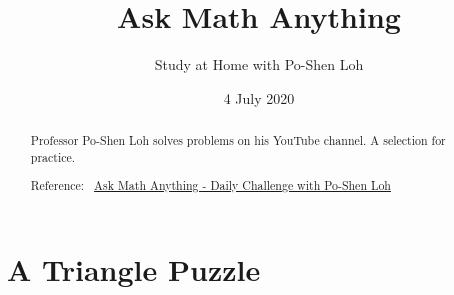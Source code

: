 \documentclass[12pt]{article}
\title{Ask Math Anything}
\author{Study at Home with Po-Shen Loh}
\date{4 July 2020}
\begin{document}
\begin{minipage}{\textwidth}
\maketitle
\begin{abstract}
Professor Po-Shen Loh solves problems on his YouTube channel. A selection for practice. 

Reference:~ 
\href{https://www.youtube.com/channel/UCf78EJOm4wQ4xXwSS15PuxQ}{Ask Math Anything - Daily Challenge with Po-Shen Loh}
\end{abstract}
\end{minipage}


\section*{A Triangle Puzzle}
\end{document}
